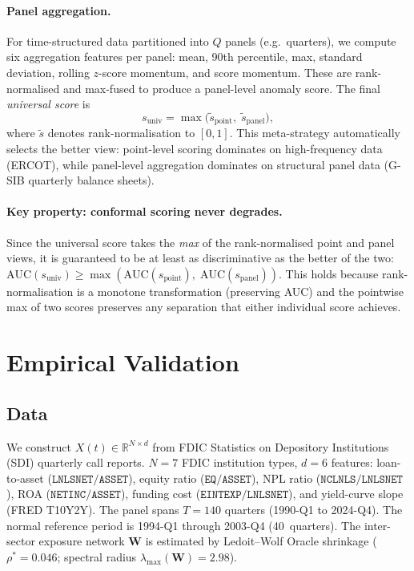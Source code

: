 \documentclass[final]{siamltex}
\newcommand{\R}{\mathbb{R}}
\newcommand{\lmax}{\lambda_{\max}}
\begin{document}
\paragraph{Panel aggregation.}
For time-structured data partitioned into $Q$ panels
(e.g.\ quarters), we compute six aggregation features per panel:
mean, 90th percentile, max, standard deviation, rolling $z$-score
momentum, and score momentum.  These are rank-normalised and
max-fused to produce a panel-level anomaly score.  The final
\emph{universal score} is
\begin{equation}\label{eq:universal}
  s_{\mathrm{univ}} = \max\bigl(\tilde{s}_{\mathrm{point}},\;
  \tilde{s}_{\mathrm{panel}}\bigr),
\end{equation}
where $\tilde{s}$ denotes rank-normalisation to $[0,1]$.
This meta-strategy automatically selects the better view:
point-level scoring dominates on high-frequency data (ERCOT),
while panel-level aggregation dominates on structural panel data
(G-SIB quarterly balance sheets).

\paragraph{Key property: conformal scoring never degrades.}
Since the universal score takes the \emph{max} of the
rank-normalised point and panel views, it is guaranteed to
be at least as discriminative as the better of the two:
$\mathrm{AUC}(s_{\mathrm{univ}}) \ge
\max(\mathrm{AUC}(s_{\mathrm{point}}),\;
\mathrm{AUC}(s_{\mathrm{panel}}))$.
This holds because rank-normalisation is a monotone
transformation (preserving AUC) and the pointwise max of two
scores preserves any separation that either individual score
achieves.

\section{Empirical Validation}\label{sec:empirical}

\subsection{Data}\label{sec:data}

We construct $X(t)\in\R^{N\times d}$ from FDIC Statistics on
Depository Institutions (SDI) quarterly call reports. $N=7$ FDIC
institution types, $d=6$ features: loan-to-asset
($\texttt{LNLSNET}/\texttt{ASSET}$), equity ratio
($\texttt{EQ}/\texttt{ASSET}$), NPL ratio
($\texttt{NCLNLS}/\texttt{LNLSNET}$), ROA
($\texttt{NETINC}/\texttt{ASSET}$), funding cost
($\texttt{EINTEXP}/\texttt{LNLSNET}$), and yield-curve slope
(FRED T10Y2Y). The panel spans $T=140$ quarters (1990-Q1 to
2024-Q4). The normal reference period is 1994-Q1 through 2003-Q4
(40~quarters). The inter-sector exposure network $\mathbf{W}$ is
estimated by Ledoit--Wolf Oracle shrinkage \cite{ledoit2004}
($\rho^*=0.046$; spectral radius $\lmax(\mathbf{W})=2.98$).
\end{document}

